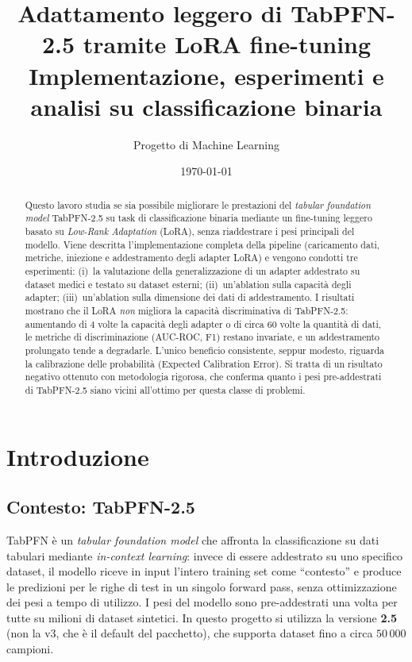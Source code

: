 \documentclass[11pt,a4paper]{article}
\title{\textbf{Adattamento leggero di TabPFN-2.5 tramite LoRA fine-tuning}\\
\large Implementazione, esperimenti e analisi su classificazione binaria}
\author{Progetto di Machine Learning}
\date{\today}
\begin{document}
\maketitle

\begin{abstract}
\noindent
Questo lavoro studia se sia possibile migliorare le prestazioni del
\emph{tabular foundation model} TabPFN-2.5 su task di classificazione binaria
mediante un fine-tuning leggero basato su \emph{Low-Rank Adaptation} (LoRA),
senza riaddestrare i pesi principali del modello. Viene descritta
l'implementazione completa della pipeline (caricamento dati, metriche,
iniezione e addestramento degli adapter LoRA) e vengono condotti tre
esperimenti: (i)~la valutazione della generalizzazione di un adapter
addestrato su dataset medici e testato su dataset esterni; (ii)~un'ablation
sulla capacità degli adapter; (iii)~un'ablation sulla dimensione dei dati di
addestramento. I risultati mostrano che il LoRA \emph{non} migliora la
capacità discriminativa di TabPFN-2.5: aumentando di 4 volte la capacità degli
adapter o di circa 60 volte la quantità di dati, le metriche di discriminazione
(AUC-ROC, F1) restano invariate, e un addestramento prolungato tende a
degradarle. L'unico beneficio consistente, seppur modesto, riguarda la
calibrazione delle probabilità (Expected Calibration Error). Si tratta di un
risultato negativo ottenuto con metodologia rigorosa, che conferma quanto i
pesi pre-addestrati di TabPFN-2.5 siano vicini all'ottimo per questa classe di
problemi.
\end{abstract}

\tableofcontents
\bigskip

\section{Introduzione}

\subsection{Contesto: TabPFN-2.5}
TabPFN è un \emph{tabular foundation model} che affronta la classificazione su
dati tabulari mediante \emph{in-context learning}: invece di essere addestrato
su uno specifico dataset, il modello riceve in input l'intero training set come
``contesto'' e produce le predizioni per le righe di test in un singolo forward
pass, senza ottimizzazione dei pesi a tempo di utilizzo. I pesi del modello
sono pre-addestrati una volta per tutte su milioni di dataset sintetici. In
questo progetto si utilizza la versione \textbf{2.5} (non la v3, che è il
default del pacchetto), che supporta dataset fino a circa $50\,000$ campioni.
\end{document}
